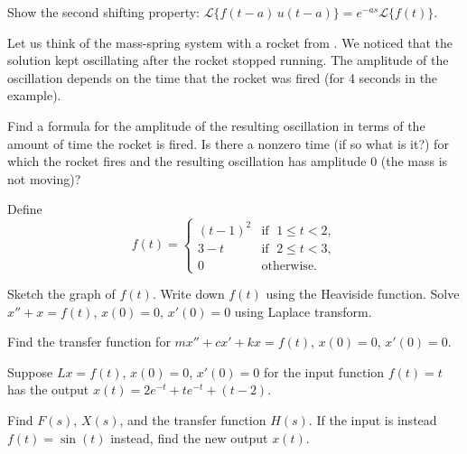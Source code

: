 \begin{exercise}
Show the second shifting property: 
$\mathcal{L} \bigl\{ f(t-a) \, u(t-a) \bigr\}
= e^{-as} \mathcal{L} \bigl\{ f(t) \bigr\}$.
\end{exercise}

\begin{exercise}
Let us think of the mass-spring system with a rocket from
.  We noticed that the solution kept oscillating
after the rocket stopped running.  The amplitude of the oscillation depends
on the time that the rocket was fired (for 4 seconds in the example).
\begin{tasks}
\task
Find a formula for the amplitude of the resulting oscillation
in terms of the amount of time the rocket is fired.
\task
 Is there
a nonzero time (if so what is it?)
for which the rocket fires and the resulting oscillation
has amplitude 0 (the mass is not moving)?
\end{tasks}
\end{exercise}

\begin{exercise}
Define
\begin{equation*}
f(t) =
\begin{cases}
{(t-1)}^2 & \text{if } \; 1 \leq t < 2, \\
3-t & \text{if } \; 2 \leq t < 3, \\
0 & \text{otherwise} .
\end{cases}
\end{equation*}
\begin{tasks}
\task Sketch the graph of $f(t)$.
\task Write down $f(t)$ using the Heaviside function.
\task Solve $x''+x=f(t)$, $x(0)=0$, $x'(0) = 0$ using Laplace transform.
\end{tasks}
\end{exercise}

\begin{exercise}
Find the transfer function for 
$m x'' + c x' + kx = f(t)$,
$x(0)=0$, $x'(0)=0$.
\end{exercise}

\begin{exercise}
Suppose $Lx = f(t)$, $x(0)=0$, $x'(0)=0$
for the input function $f(t) = t$ has the output
$x(t) = 2e^{-t} + te^{-t} + (t-2)$.
\begin{tasks}
\task Find $F(s)$, $X(s)$, and the transfer function $H(s)$.
\task If the input is instead $f(t) = \sin(t)$ instead, find the new output $x(t)$.
\end{tasks}
\end{exercise}

